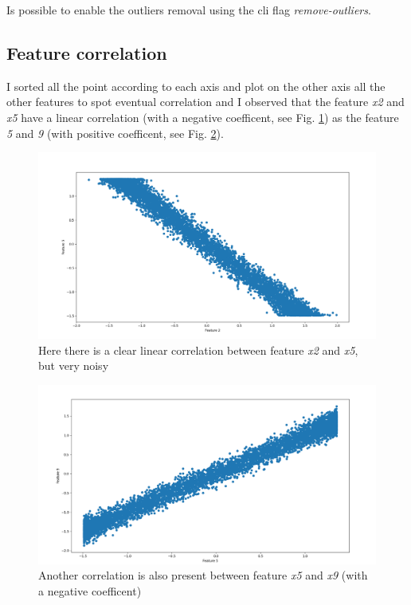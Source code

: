 Is possible to enable the outliers removal using the cli flag \textit{\-\-remove-outliers}.\\

\subsection{Feature correlation}
I sorted all the point according to each axis and plot on the other axis all the other features to spot eventual correlation and I observed that the feature \textit{x2} and \textit{x5} have a linear correlation (with a negative coefficent, see Fig. \ref{fig:corr25}) as the feature \textit{5} and \textit{9} (with positive coefficent, see Fig. \ref{fig:corr59}).\\ 

\begin{figure}[h]
    \includegraphics[width=\textwidth]{images/feature_2_5_correlation.png}
    \caption{Here there is a clear linear correlation between feature \textit{x2} and \textit{x5}, but very noisy}
    \label{fig:corr25}
\end{figure}

\begin{figure}[h]
    \includegraphics[width=\textwidth]{images/feature_5_9_correlation.png}
    \caption{Another correlation is also present between feature \textit{x5} and \textit{x9} (with a negative coefficent)}
    \label{fig:corr59}
\end{figure}

